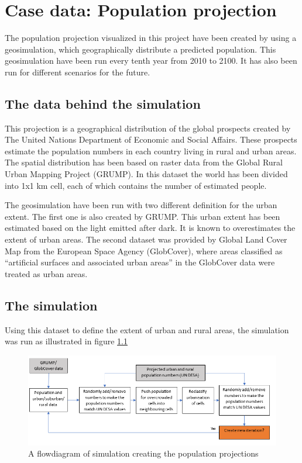 \chapter{Case data: Population projection}
The population projection visualized in this project have been created by \citet{Kessler} using a geosimulation, which geographically distribute a predicted population. This geosimulation have been run every tenth year from 2010 to 2100. It has also been run for different scenarios for the future.

\section{The data behind the simulation}\label{TheDataBehind}
This projection is a geographical distribution of the global prospects created by The United Nations Department of Economic and Social Affairs. These prospects estimate the population numbers in each country living in rural and urban areas. The spatial distribution has been based on raster data from the Global Rural Urban Mapping Project (GRUMP). In this dataset the world has been divided into 1x1 km cell, each of which contains the number of estimated people. \citep{Kessler}

The geosimulation have been run with two different definition for the urban extent. The first one is also created by GRUMP. This urban extent has been estimated based on the light emitted after dark. It is known to overestimates the extent of urban areas. \citep{Kessler}
The second dataset was provided by Global Land Cover Map from the European Space Agency (GlobCover), where areas classified as “artificial surfaces and associated urban areas” in the GlobCover data were treated as urban areas. 

\section{The simulation}
Using this dataset to define the extent of urban and rural areas, the simulation was run as illustrated in figure \ref{CreatingData}

\begin{figure} [H]
	\centering
	\includegraphics[width=1\textwidth]{Pictures/CreatingData}
	\caption{A flowdiagram of simulation creating the population projections}
	\label{CreatingData}
\end{figure}

